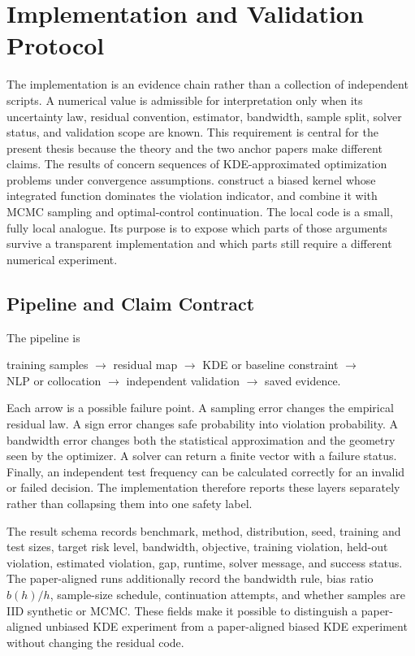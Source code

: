 \section{Implementation and Validation Protocol}
\label{ch:implementation}

The implementation is an evidence chain rather than a collection of independent scripts. A numerical value is admissible for interpretation only when its uncertainty law, residual convention, estimator, bandwidth, sample split, solver status, and validation scope are known. This requirement is central for the present thesis because the theory and the two anchor papers make different claims. The results of \citet{schuster2025} concern sequences of KDE-approximated optimization problems under convergence assumptions. \citet{keil2020,keil2021} construct a biased kernel whose integrated function dominates the violation indicator, and combine it with MCMC sampling and optimal-control continuation. The local code is a small, fully local analogue. Its purpose is to expose which parts of those arguments survive a transparent implementation and which parts still require a different numerical experiment.

\subsection{Pipeline and Claim Contract}
\label{sec:claim-contract}

The pipeline is
\begin{center}
training samples $\rightarrow$ residual map $\rightarrow$ KDE or baseline constraint $\rightarrow$\\
NLP or collocation $\rightarrow$ independent validation $\rightarrow$ saved evidence.
\end{center}
Each arrow is a possible failure point. A sampling error changes the empirical residual law. A sign error changes safe probability into violation probability. A bandwidth error changes both the statistical approximation and the geometry seen by the optimizer. A solver can return a finite vector with a failure status. Finally, an independent test frequency can be calculated correctly for an invalid or failed decision. The implementation therefore reports these layers separately rather than collapsing them into one safety label.

The result schema records benchmark, method, distribution, seed, training and test sizes, target risk level, bandwidth, objective, training violation, held-out violation, estimated violation, gap, runtime, solver message, and success status. The paper-aligned runs additionally record the bandwidth rule, bias ratio $b(h)/h$, sample-size schedule, continuation attempts, and whether samples are IID synthetic or MCMC. These fields make it possible to distinguish a paper-aligned unbiased KDE experiment from a paper-aligned biased KDE experiment without changing the residual code.

